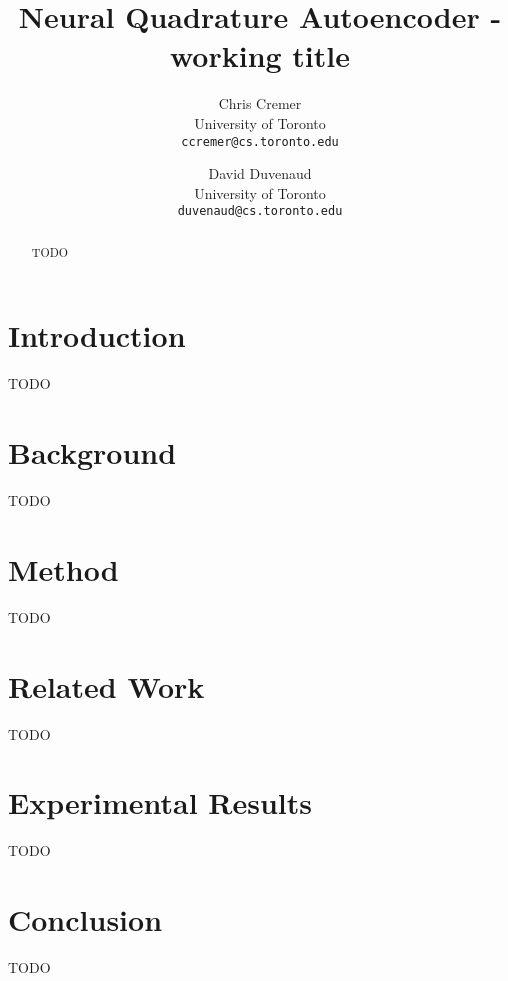 \documentclass{article} %
\title{Neural Quadrature Autoencoder - working title}
\author{
Chris Cremer \\
University of Toronto\\
\texttt{ccremer@cs.toronto.edu} \\
\and
David Duvenaud \\
University of Toronto \\
\texttt{duvenaud@cs.toronto.edu} \\
}
\begin{document}
\maketitle

\begin{abstract}
TODO

\end{abstract}

\section{Introduction}
TODO 

\section{Background}
TODO 

\section{Method}
TODO 

\section{Related Work}
TODO

\section{Experimental Results}
TODO

\section{Conclusion}
TODO




\end{document}
